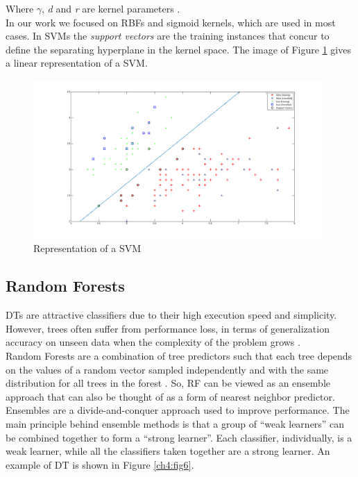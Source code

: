 Where $\gamma$, \textit{d} and \textit{r} are kernel parameters \cite{ML01}.\\
In our work we focused on \Glspl{RBF} and sigmoid kernels, which are used in most cases.
In \Glspl{SVM} the \textit{support vectors} are the training instances that concur to define the separating hyperplane in the kernel space. The 
image of Figure \ref{ch4:fig5} gives a linear representation of a \Gls{SVM}.

\begin{figure}[!hbt]
  \centering
    \includegraphics[width=0.98\textwidth]{./images/SVM_example.png}
  \caption{Representation of a SVM}
  \label{ch4:fig5}
\end{figure}


\vspace{0.5cm}

\subsection{Random Forests}

\Glspl{DT} are attractive classifiers due to their high execution speed and simplicity. However, trees often suffer from performance loss, in terms
of generalization accuracy on unseen data when the complexity of the problem grows \cite{randForests01}.\\
Random Forests are a combination of tree predictors such that each tree depends on the values of a
random vector sampled independently and with the same distribution for all trees in the forest \cite{randForests03}.
So, \Gls{RF} can be viewed as an ensemble approach that can also be thought of as a form of nearest neighbor predictor.
Ensembles are a divide-and-conquer approach used to improve performance. The main principle behind ensemble methods is that a group of \textquotedblleft weak learners\textquotedblright
can be combined together to form a \textquotedblleft strong learner\textquotedblright. Each classifier, individually, is a weak learner, while all the classifiers taken together are a strong learner.
An example of \Gls{DT} is shown in Figure \ref{ch4:fig6}.

